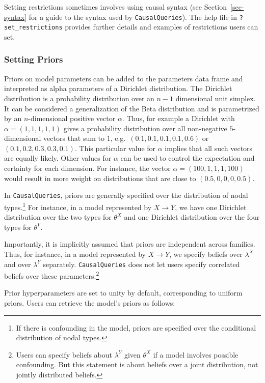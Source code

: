 \documentclass[
  11pt,
  article]{jss}
\begin{document}
Setting restrictions sometimes involves using causal syntax (see
Section~\ref{sec-syntax} for a guide to the syntax used by
\texttt{CausalQueries}). The help file in \texttt{?set\_restrictions}
provides further details and examples of restrictions users can set.

\subsubsection{Setting Priors}\label{priors}

Priors on model parameters can be added to the parameters data frame and
interpreted as alpha parameters of a Dirichlet distribution. The
Dirichlet distribution is a probability distribution over an \(n-1\)
dimensional unit simplex. It can be considered a generalization of the
Beta distribution and is parametrized by an \(n\)-dimensional positive
vector \(\alpha\). Thus, for example a Dirichlet with
\(\alpha = (1, 1, 1, 1, 1)\) gives a probability distribution over all
non-negative \(5\)-dimensional vectors that sum to \(1\),
e.g.~\((0.1, 0.1, 0.1, 0.1, 0.6)\) or \((0.1, 0.2, 0.3, 0.3, 0.1)\).
This particular value for \(\alpha\) implies that all such vectors are
equally likely. Other values for \(\alpha\) can be used to control the
expectation and certainty for each dimension. For instance, the vector
\(\alpha = (100, 1, 1, 1, 100)\) would result in more weight on
distributions that are close to \((0.5, 0, 0, 0, 0.5)\).

In \texttt{CausalQueries}, priors are generally specified over the
distribution of nodal types.\footnote{If there is confounding in the
  model, priors are specified over the conditional distribution of nodal
  types.} For instance, in a model represented by \(X \rightarrow Y\),
we have one Dirichlet distribution over the two types for \(\theta^X\)
and one Dirichlet distribution over the four types for \(\theta^Y\).

Importantly, it is implicitly assumed that priors are independent across
families. Thus, for instance, in a model represented by
\(X \rightarrow Y\), we specify beliefs over \(\lambda^X\) and over
\(\lambda^Y\) separately. \texttt{CausalQueries} does not let users
specify correlated beliefs over these parameters.\footnote{Users can
  specify beliefs about \(\lambda^Y\) given \(\theta^X\) if a model
  involves possible confounding. But this statement is about beliefs
  over a joint distribution, not jointly distributed beliefs.}

Prior hyperparameters are set to unity by default, corresponding to
uniform priors. Users can retrieve the model's priors as follows:
\end{document}
